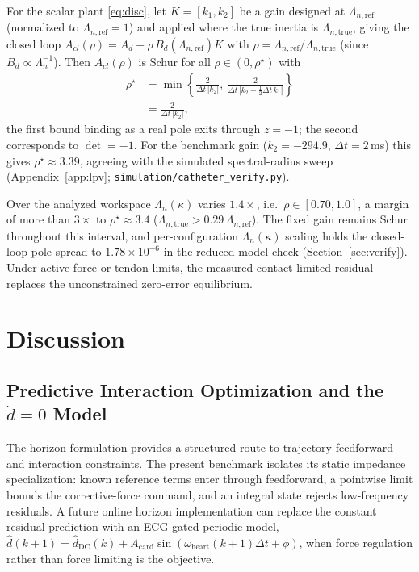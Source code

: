 \begin{proposition}\label{prop:lpv}
For the scalar plant \eqref{eq:disc}, let $K=[k_1,k_2]$ be a gain designed at $\Lambda_{n,\text{ref}}$ (normalized to $\Lambda_{n,\text{ref}}=1$) and applied where the true inertia is $\Lambda_{n,\text{true}}$, giving the closed loop $A_{cl}(\rho)=A_d-\rho\,B_d(\Lambda_{n,\text{ref}})K$ with $\rho=\Lambda_{n,\text{ref}}/\Lambda_{n,\text{true}}$ (since $B_d\propto\Lambda_n^{-1}$). Then $A_{cl}(\rho)$ is Schur for all $\rho\in(0,\rho^\star)$ with
\begin{align}
\rho^\star
&=\min\!\left\{\frac{2}{\Delta t\,|k_2|},\
\frac{2}{\Delta t\,|k_2-\tfrac12\Delta t\,k_1|}\right\} \nonumber\\
&=\frac{2}{\Delta t\,|k_2|},
\label{eq:rhostar}
\end{align}
the first bound binding as a real pole exits through $z=-1$; the second corresponds to $\det=-1$. For the benchmark gain ($k_2=-294.9$, $\Delta t=2$\,ms) this gives $\rho^\star\approx3.39$, agreeing with the simulated spectral-radius sweep (Appendix~\ref{app:lpv}; \texttt{simulation/catheter\_verify.py}).
\end{proposition}

\begin{remark}\label{rmk:lpv}
Over the analyzed workspace $\Lambda_n(\kappa)$ varies $1.4\times$, i.e.\ $\rho\in[0.70,1.0]$, a margin of more than $3\times$ to $\rho^\star\approx3.4$ ($\Lambda_{n,\text{true}}>0.29\,\Lambda_{n,\text{ref}}$). The fixed gain remains Schur throughout this interval, and per-configuration $\Lambda_n(\kappa)$ scaling holds the closed-loop pole spread to $1.78\times10^{-6}$ in the reduced-model check (Section~\ref{sec:verify}). Under active force or tendon limits, the measured contact-limited residual replaces the unconstrained zero-error equilibrium.
\end{remark}

\section{Discussion}\label{sec:discussion}

\subsection{Predictive Interaction Optimization and the $\dot d=0$ Model}\label{sec:ddot}

The horizon formulation provides a structured route to trajectory feedforward and interaction constraints. The present benchmark isolates its static impedance specialization: known reference terms enter through feedforward, a pointwise limit bounds the corrective-force command, and an integral state rejects low-frequency residuals. A future online horizon implementation can replace the constant residual prediction with an ECG-gated periodic model, $\hat d(k{+}1)=\hat d_{\text{DC}}(k)+A_{\text{card}}\sin(\omega_{\text{heart}}(k{+}1)\Delta t+\phi)$, when force regulation rather than force limiting is the objective.

